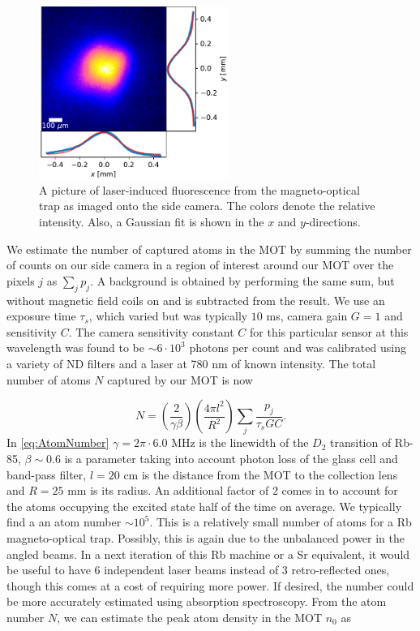 \begin{figure}
    \centering
    \includegraphics[width=0.55\textwidth]{figures/FluoresenceAndFits.pdf}
    \caption{A picture of laser-induced fluorescence from the magneto-optical trap as imaged onto the side camera. 
    The colors denote the relative intensity.
    Also, a Gaussian fit is shown in the $x$ and $y$-directions.}
    \label{fig:LiF}
\end{figure}

We estimate the number of captured atoms in the MOT by summing the number of counts on our side camera in a region of interest around our MOT over the pixels $j$ as $\sum_j p_j$.
A background is obtained by performing the same sum, but without magnetic field coils on and is subtracted from the result. 
We use an exposure time $\tau_s$, which varied but was typically $10$ ms, camera gain $G = 1$ and sensitivity $C$.
The camera sensitivity constant $C$ for this particular sensor at this wavelength was found to be $\sim 6 \cdot 10^3$ photons per count and was calibrated using a variety of ND filters and a laser at 780 nm of known intensity. The total number of atoms $N$ captured by our MOT is now
 
 \begin{equation}\label{eq:AtomNumber}
     N = \left( \frac{2}{\gamma\beta}\right)
     \left(\frac{4\pi l^2}{R^2}\right)
     \sum_j \frac{p_j}{\tau_s G C}.
 \end{equation}
In \cref{eq:AtomNumber} $\gamma = 2\pi \cdot 6.0$ MHz is the linewidth of the $D_2$ transition of Rb-85, $\beta \sim 0.6$ is a parameter taking into account photon loss of the glass cell and band-pass filter, $l = 20$ cm is the distance from the MOT to the collection lens and $R = 25$ mm is its radius. 
An additional factor of 2 comes in to account for the atoms occupying the excited state half of the time on average. 
We typically find a an atom number $\sim 10^5$.
This is a relatively small number of atoms for a Rb magneto-optical trap.
Possibly, this is again due to the unbalanced power in the angled beams. In a next iteration of this Rb machine or a Sr equivalent, it would be useful to have 6 independent laser beams instead of 3 retro-reflected ones, though this comes at a cost of requiring more power. 
If desired, the number could be more accurately estimated using absorption spectroscopy.
From the atom number $N$, we can estimate the peak atom density in the MOT $n_0$ as \cite{Townsend1995}


